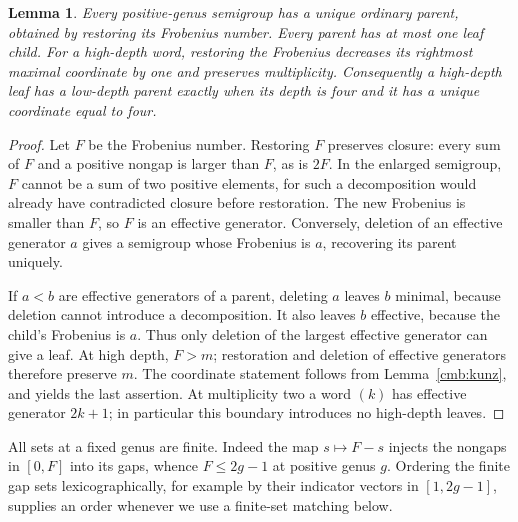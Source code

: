 \documentclass[11pt]{amsart}
\newtheorem{lemma}[theorem]{Lemma}
\theoremstyle{definition}
\theoremstyle{remark}
\numberwithin{equation}{section}
\begin{document}
\begin{lemma}\label{cmb:parent}
Every positive-genus semigroup has a unique ordinary parent, obtained by
restoring its Frobenius number. Every parent has at most one leaf child.
For a high-depth word, restoring the Frobenius decreases its rightmost
maximal coordinate by one and preserves multiplicity. Consequently a
high-depth leaf has a low-depth parent exactly when its depth is four and
it has a unique coordinate equal to four.
\end{lemma}
\begin{proof}
Let $F$ be the Frobenius number. Restoring $F$ preserves closure: every sum
of $F$ and a positive nongap is larger than $F$, as is $2F$. In the enlarged
semigroup, $F$ cannot be a sum of two positive elements, for such a
decomposition would already have contradicted closure before restoration.
The new Frobenius is smaller than $F$, so $F$ is an effective generator.
Conversely, deletion of an effective generator $a$ gives a semigroup whose
Frobenius is $a$, recovering its parent uniquely.

If $a<b$ are effective generators of a parent, deleting $a$ leaves $b$
minimal, because deletion cannot introduce a decomposition. It also leaves
$b$ effective, because the child's Frobenius is $a$. Thus only deletion of
the largest effective generator can give a leaf. At high depth, $F>m$;
restoration and deletion of effective generators therefore preserve $m$.
The coordinate statement follows from Lemma~\ref{cmb:kunz}, and yields the
last assertion. At multiplicity two a word $(k)$ has effective generator
$2k+1$; in particular this boundary introduces no high-depth leaves.
\end{proof}

All sets at a fixed genus are finite. Indeed the map $s\mapsto F-s$
injects the nongaps in $[0,F]$ into its gaps, whence $F\le2g-1$ at positive
genus $g$. Ordering the finite gap sets lexicographically, for example by
their indicator vectors in $[1,2g-1]$, supplies an order whenever we use a
finite-set matching below.
\end{document}

